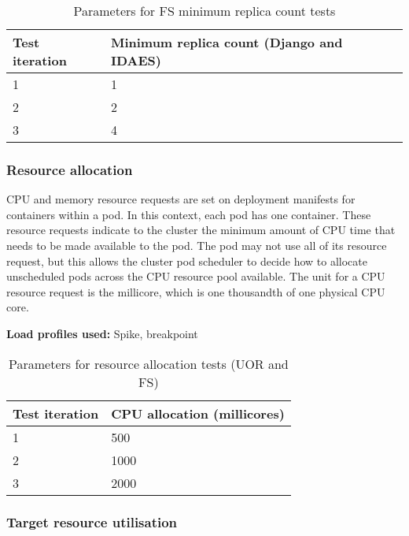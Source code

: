 \begin{table}[h]
    \centering
    \begin{tabularx}{\textwidth}{|X|X|}
        \hline
        \textbf{Test iteration} & \textbf{Minimum replica count (Django and IDAES)}  \\ \hline
        1 & 1 \\ \hline
        2 & 2 \\ \hline
        3 & 4 \\ \hline
    \end{tabularx}
    \caption{Parameters for FS minimum replica count tests}
    \label{table:test-min-replica-count-fs}
\end{table}

\subsubsection{Resource allocation}

CPU and memory resource requests are set on deployment manifests for containers within a pod. In this context, each pod has one container. These resource requests indicate to the cluster the minimum amount of CPU time  that needs to be made available to the pod. The pod may not use all of its resource request, but this allows the cluster pod scheduler to decide how to allocate unscheduled pods across the CPU resource pool available. The unit for a CPU resource request is the millicore, which is one thousandth of one physical CPU core.

\textbf{Load profiles used:} Spike, breakpoint

\begin{table}[h]
    \centering
    \begin{tabularx}{\textwidth}{|X|X|}
        \hline
        \textbf{Test iteration} & \textbf{CPU allocation (millicores)}  \\ \hline
        1 & 500 \\ \hline
        2 & 1000 \\ \hline
        3 & 2000 \\ \hline
    \end{tabularx}
    \caption{Parameters for resource allocation tests (UOR and FS)}
    \label{table:test-resource-allocation}
\end{table}

\subsubsection{Target resource utilisation}

